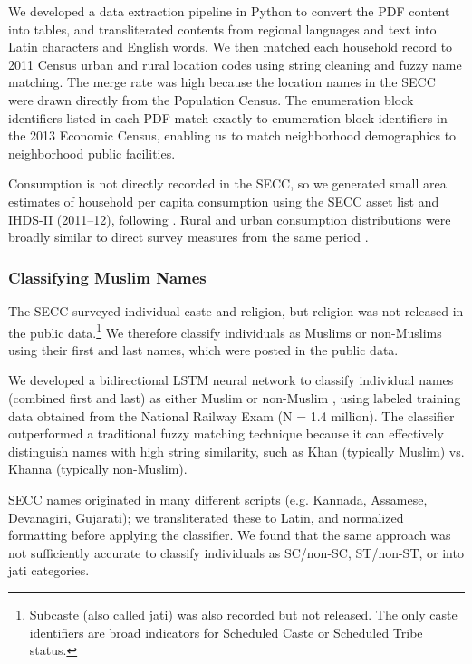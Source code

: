 \documentclass[12pt]{article}
\begin{document}
  We developed a data extraction pipeline in Python to convert the PDF content into tables, and transliterated contents from regional languages and text into Latin characters and English words. We then matched each household record to 2011 Census urban and rural location codes using string cleaning and fuzzy name matching. The merge rate was high because the location names in the SECC were drawn directly from the Population Census. The enumeration block identifiers listed in each PDF match exactly to enumeration block identifiers in the 2013 Economic Census, enabling us to match neighborhood demographics to neighborhood public facilities.

Consumption is not directly recorded in the SECC, so we generated small area estimates of household per capita consumption using the SECC asset list and IHDS-II (2011--12), following \citet{elbers2003}. Rural and urban consumption distributions were broadly similar to direct survey measures from the same period \citep{almn2019shrug}.

\subsubsection{Classifying Muslim Names}

The SECC surveyed individual caste and religion, but religion was not released in the public data.\footnote{Subcaste (also called jati) was also recorded but not released. The only caste identifiers are broad indicators for Scheduled Caste or Scheduled Tribe status.}  We therefore classify individuals as Muslims or non-Muslims using their first and last names, which were posted in the public data.

We developed a bidirectional LSTM neural network to classify individual names (combined first and last) as either Muslim or non-Muslim \citep{ash2025}, using labeled training data obtained from the National Railway Exam (N = 1.4 million). The classifier outperformed a traditional fuzzy matching technique because it can effectively distinguish names with high string similarity, such as Khan (typically Muslim) vs. Khanna (typically non-Muslim).

SECC names originated in many different scripts (e.g. Kannada, Assamese, Devanagiri, Gujarati); we transliterated these to Latin, and normalized formatting before applying the classifier. We found that the same approach was not sufficiently accurate to classify individuals as SC/non-SC, ST/non-ST, or into jati categories.
\end{document}
